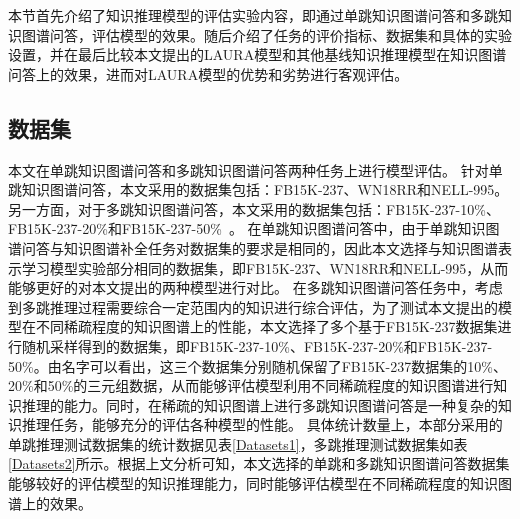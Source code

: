 \documentclass[algorithmlist, AutoFakeBold, AutoFakeSlant, figurelist, tablelist, nomlist, engineering]{seuthesix}
\begin{document}
本节首先介绍了知识推理模型的评估实验内容，即通过单跳知识图谱问答和多跳知识图谱问答，评估模型的效果。随后介绍了任务的评价指标、数据集和具体的实验设置，并在最后比较本文提出的LAURA模型和其他基线知识推理模型在知识图谱问答上的效果，进而对LAURA模型的优势和劣势进行客观评估。

\subsection{数据集}
本文在单跳知识图谱问答和多跳知识图谱问答两种任务上进行模型评估。
针对单跳知识图谱问答，本文采用的数据集包括：FB15K-237、WN18RR和NELL-995。
另一方面，对于多跳知识图谱问答，本文采用的数据集包括：FB15K-237-10\%、FB15K-237-20\%和FB15K-237-50\%~\cite{lv2020dynamic}。%
在单跳知识图谱问答中，由于单跳知识图谱问答与知识图谱补全任务对数据集的要求是相同的，因此本文选择与知识图谱表示学习模型实验部分相同的数据集，即FB15K-237、WN18RR和NELL-995，从而能够更好的对本文提出的两种模型进行对比。
在多跳知识图谱问答任务中，考虑到多跳推理过程需要综合一定范围内的知识进行综合评估，为了测试本文提出的模型在不同稀疏程度的知识图谱上的性能，本文选择了多个基于FB15K-237数据集进行随机采样得到的数据集，即FB15K-237-10\%、FB15K-237-20\%和FB15K-237-50\%。由名字可以看出，这三个数据集分别随机保留了FB15K-237数据集的10\%、20\%和50\%的三元组数据，从而能够评估模型利用不同稀疏程度的知识图谱进行知识推理的能力。同时，在稀疏的知识图谱上进行多跳知识图谱问答是一种复杂的知识推理任务，能够充分的评估各种模型的性能。
具体统计数量上，本部分采用的单跳推理测试数据集的统计数据见表\ref{Datasets1}，多跳推理测试数据集如表\ref{Datasets2}所示。根据上文分析可知，本文选择的单跳和多跳知识图谱问答数据集能够较好的评估模型的知识推理能力，同时能够评估模型在不同稀疏程度的知识图谱上的效果。
\end{document}
